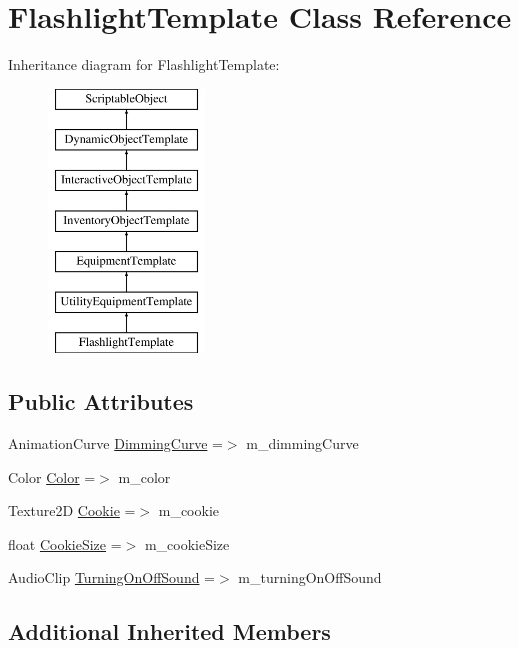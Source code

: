 \hypertarget{class_flashlight_template}{}\section{Flashlight\+Template Class Reference}
\label{class_flashlight_template}
Inheritance diagram for Flashlight\+Template\+:\begin{figure}[H]
\begin{center}
\leavevmode
\includegraphics[height=7.000000cm]{class_flashlight_template}
\end{center}
\end{figure}
\subsection*{Public Attributes}
\begin{DoxyCompactItemize}
\item 
Animation\+Curve \mbox{\hyperlink{class_flashlight_template_aa199c479c6cd3713d0a39594bdc902e6}{Dimming\+Curve}} =$>$ m\+\_\+dimming\+Curve
\item 
Color \mbox{\hyperlink{class_flashlight_template_a0ccc22d2baa4d43abe70c66f2e388213}{Color}} =$>$ m\+\_\+color
\item 
Texture2D \mbox{\hyperlink{class_flashlight_template_ab042ec0508410a34a1a24057af3c23c1}{Cookie}} =$>$ m\+\_\+cookie
\item 
float \mbox{\hyperlink{class_flashlight_template_a5a1bc301fd9ff0b540373ed773745aea}{Cookie\+Size}} =$>$ m\+\_\+cookie\+Size
\item 
Audio\+Clip \mbox{\hyperlink{class_flashlight_template_a174295af21422d85b76eb37fedb227f6}{Turning\+On\+Off\+Sound}} =$>$ m\+\_\+turning\+On\+Off\+Sound
\end{DoxyCompactItemize}
\subsection*{Additional Inherited Members}


